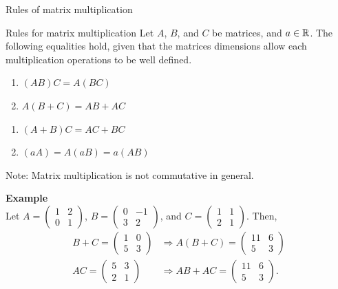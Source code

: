\documentclass[9pt]{beamer}
\begin{document}
\begin{frame}{Rules of matrix multiplication}

    \begin{block}{Rules for matrix multiplication}
    Let $A$, $B$, and $C$ be matrices, and $a\in\mathbb{R}$. The following equalities hold, given that the matrices dimensions allow each multiplication operations to be well defined.

    \begin{minipage}{0.4\textwidth}
    \begin{enumerate}[leftmargin = 0.8cm, label = $\bullet$, rightmargin = 0.2cm]
        \item $(AB)C = A(BC)$
        \item $A(B+C) = AB + AC$
    \end{enumerate}
    \end{minipage}
    \begin{minipage}{0.4\textwidth}
    \begin{enumerate}[leftmargin = 0.8cm, label = $\bullet$, rightmargin = 0.2cm]
        \item $(A+B)C = AC + BC$
        \item $(aA) = A(aB) = a(AB)$
    \end{enumerate}
    \end{minipage}
    

    Note: Matrix multiplication is not commutative in general.
    \end{block}

    \textbf{Example}\\
        Let $A = \begin{pmatrix}
        1 & 2 \\
        0 & 1 
        \end{pmatrix}$, $B = \begin{pmatrix}
        0 & -1 \\
        3 & 2 
        \end{pmatrix}$, and $C = \begin{pmatrix}
        1 & 1 \\
        2 & 1 
        \end{pmatrix}$. Then,
        \begin{align*}
        B+C = \begin{pmatrix}
        1 & 0 \\
        5 & 3 
        \end{pmatrix} &\Longrightarrow A(B+C) = \begin{pmatrix}
        11 & 6 \\
        5 & 3 
        \end{pmatrix}\\
        AC = \begin{pmatrix}
        5 & 3 \\
        2 & 1 
        \end{pmatrix} &\Longrightarrow AB + AC = \begin{pmatrix}
        11 & 6 \\
        5 & 3 
        \end{pmatrix}.
        \end{align*}
    
\end{frame}
\end{document}
